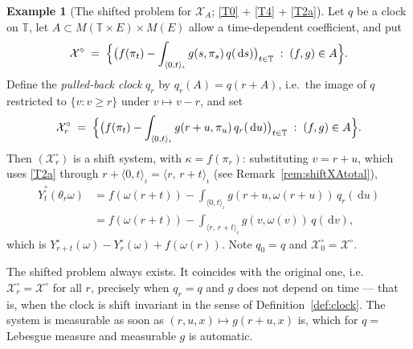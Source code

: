 \documentclass[11pt,a4paper]{article}
\theoremstyle{plain}
\theoremstyle{definition}
\newtheorem{example}[theorem]{Example}
\theoremstyle{remark}
\newcommand{\T}{\mathbb{T}}                     %
\newcommand{\Meas}{M}                          %
\newcommand{\XX}{\mathcal{X}}                  %
\newcommand{\dif}{\,\mathrm{d}}
\begin{document}
\begin{example}[The shifted problem for $\XX_A$; \eqref{T0} + \eqref{T4} + \eqref{T2a}]
  \label{ex:shiftXA}
  Let $q$ be a clock on $\T$, let $A \subset \Meas(\T \times E) \times \Meas(E)$
  allow a time-dependent coefficient, and put
  \[
    \XX^\circ \;=\; \Bigl\{ \bigl( f(\pi_t)
      - \int_{\langle 0,t \rangle_\iota} g(s,\pi_s)\, q(\dif s) \bigr)_{t \in \T}
      \;:\; (f,g) \in A \Bigr\} .
  \]
  Define the \emph{pulled-back clock} $q_r$ by $q_r(A) = q(r + A)$, i.e.\ the
  image of $q$ restricted to $\{v : v \geq r\}$ under $v \mapsto v - r$, and set
  \[
    \XX^\circ_r \;=\; \Bigl\{ \bigl( f(\pi_t)
      - \int_{\langle 0,t \rangle_\iota} g(r+u,\pi_u)\, q_r(\dif u) \bigr)_{t \in \T}
      \;:\; (f,g) \in A \Bigr\} .
  \]
  Then $(\XX^\circ_r)$ is a shift system, with $\kappa = f(\pi_r)$: substituting
  $v = r+u$, which uses \eqref{T2a} through
  $r + \langle 0,t \rangle_\iota = \langle r,\,r+t \rangle_\iota$ (see
  Remark~\ref{rem:shiftXAtotal}),
  \begin{align*}
    \hat{Y}^\circ_t(\theta_r\omega)
      &= f(\omega(r+t)) - \int_{\langle 0,t \rangle_\iota} g(r+u,\omega(r+u))\, q_r(\dif u) \\
      &= f(\omega(r+t)) - \int_{\langle r,\,r+t \rangle_\iota} g(v,\omega(v))\, q(\dif v) ,
  \end{align*}
  which is $Y^\circ_{r+t}(\omega) - Y^\circ_r(\omega) + f(\omega(r))$.  Note
  $q_0 = q$ and $\XX^\circ_0 = \XX^\circ$.

  The shifted problem always exists.  It coincides with the original one, i.e.\
  $\XX^\circ_r = \XX^\circ$ for all $r$, precisely when $q_r = q$ and $g$ does not
  depend on time --- that is, when the clock is shift invariant in the sense of
  Definition~\ref{def:clock}.  The system is measurable as soon as
  $(r,u,x) \mapsto g(r+u,x)$ is, which for $q = $ Lebesgue measure and
  measurable $g$ is automatic.
\end{example}
\end{document}
